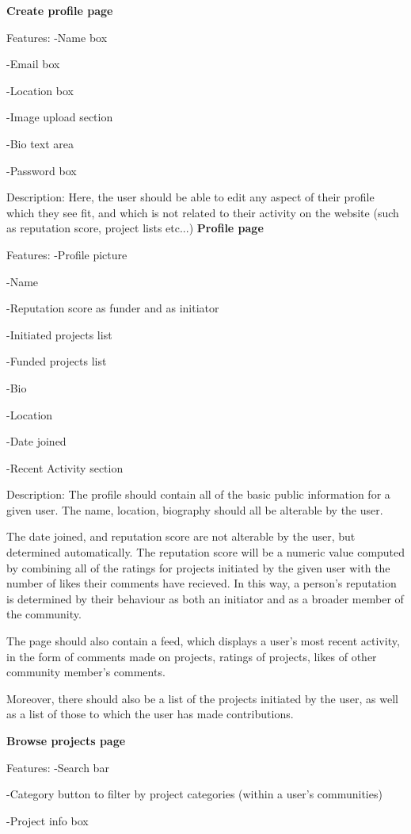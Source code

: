 \documentclass[12pt]{article}
\begin{document}
\begin{enumerate}
\textbf{Create profile page}

Features:
-Name box

-Email box

-Location box

-Image upload section

-Bio text area

-Password box

Description:
Here, the user should be able to edit any aspect of their profile which they see fit, and which is not related to their activity
on the website (such as reputation score, project lists etc...)
\textbf{Profile page}

Features:
-Profile picture

-Name

-Reputation score as funder and as initiator

-Initiated projects list

-Funded projects list

-Bio

-Location

-Date joined

-Recent Activity section

Description:
The profile should contain all of the basic public information for a given user. The name, location, biography should all be
alterable by the user.

The date joined, and reputation score are not alterable by the user, but determined automatically.
The reputation score will be a numeric value computed by combining all of the ratings for projects initiated by the given user with 
the number of likes their comments have recieved. In this way, a person's reputation is determined by their behaviour as both an initiator
and as a broader member of the community.

The page should also contain a feed, which displays a user's most recent activity, in the form of comments made on projects, ratings of projects,
likes of other community member's comments.

Moreover, there should also be a list of the projects initiated by the user, as well as a list of those to which the user has made contributions.

\textbf{Browse projects page}

Features:
-Search bar

-Category button to filter by project categories (within a user's communities)

-Project info box


\end{enumerate}
\end{document}
